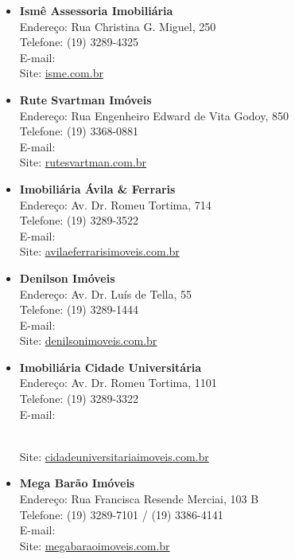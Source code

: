 \begin{itemize}
\item \textbf{Ismê Assessoria Imobiliária}
  \\Endereço: Rua Christina G. Miguel, 250
  \\Telefone: (19) 3289-4325
  \\E-mail: 
  \\Site: \url{isme.com.br}

\item \textbf{Rute Svartman Imóveis}
  \\Endereço: Rua Engenheiro Edward de Vita Godoy, 850
  \\Telefone: (19) 3368-0881
  \\E-mail: 
  \\Site: \url{rutesvartman.com.br}

\item \textbf{Imobiliária Ávila \& Ferraris}
  \\Endereço: Av. Dr. Romeu Tortima, 714
  \\Telefone: (19) 3289-3522
  \\E-mail: 
  \\Site: \url{avilaeferrarisimoveis.com.br}

\item \textbf{Denilson Imóveis}
  \\Endereço: Av. Dr. Luís de Tella, 55
  \\Telefone: (19) 3289-1444
  \\E-mail: 
  \\Site: \url{denilsonimoveis.com.br}

\item \textbf{Imobiliária Cidade Universitária}
  \\Endereço: Av. Dr. Romeu Tortima, 1101
  \\Telefone: (19) 3289-3322
  \\E-mail:\\
  \begin{small}
  \end{small}
  \\Site: \url{cidadeuniversitariaimoveis.com.br}

\item \textbf{Mega Barão Imóveis}
  \\Endereço: Rua Francisca Resende Merciai, 103 B
  \\Telefone: (19) 3289-7101 / (19) 3386-4141
  \\E-mail: 
  \\Site: \url{megabaraoimoveis.com.br}


\end{itemize}
